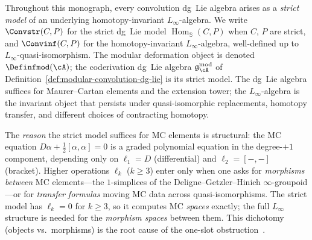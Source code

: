 \begin{remark}
\label{rem:two-level-convention}
Throughout this monograph, every convolution dg~Lie algebra arises
as a \emph{strict model} of an underlying homotopy-invariant
$L_\infty$-algebra.  We write $\Convstr(C,P)$ for the strict
dg~Lie model $\operatorname{Hom}_{\mathbb{S}}(C,P)$ when $C$, $P$
are strict, and $\Convinf(C,P)$ for the homotopy-invariant
$L_\infty$-algebra, well-defined up to $L_\infty$-quasi-isomorphism.
The modular deformation object is denoted
$\Definfmod(\cA)$; the coderivation dg~Lie algebra
$\mathfrak{g}_{\cA}^{\mathrm{mod}}$ of
Definition~\ref{def:modular-convolution-dg-lie} is its strict model.
The dg~Lie algebra suffices for Maurer--Cartan elements and the
extension tower; the $L_\infty$-algebra is the invariant object
that persists under quasi-isomorphic replacements, homotopy
transfer, and different choices of contracting homotopy.

The \emph{reason} the strict model suffices for MC elements is
structural: the MC equation
$D\alpha + \tfrac{1}{2}[\alpha,\alpha] = 0$ is a graded polynomial
equation in the degree-$+1$ component, depending only on
$\ell_1 = D$ (differential) and $\ell_2 = [-,-]$ (bracket).
Higher operations $\ell_k$ ($k \geq 3$) enter only when one asks
for \emph{morphisms between} MC elements---the $1$-simplices of
the Deligne--Getzler--Hinich $\infty$-groupoid---or for
\emph{transfer formulas} moving MC data across quasi-isomorphisms.
The strict model has $\ell_k = 0$ for $k \geq 3$, so it computes
MC \emph{spaces} exactly; the full $L_\infty$ structure is needed
for the \emph{morphism spaces} between them.  This dichotomy
(objects vs.\ morphisms) is the root cause of the one-slot
obstruction~\cite[Section~6]{RNW19}.


\end{remark}
